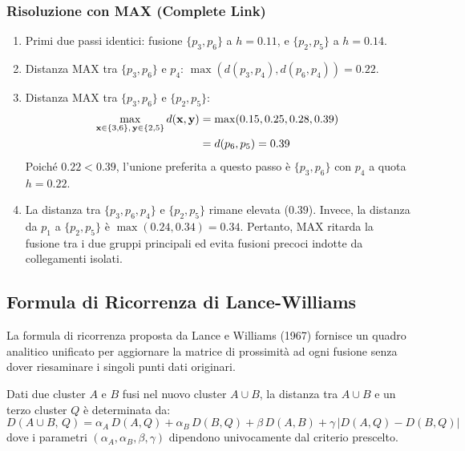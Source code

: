 \subsubsection{Risoluzione con MAX (Complete Link)}
\begin{enumerate}
    \item Primi due passi identici: fusione $\{p_3, p_6\}$ a $h = 0.11$, e $\{p_2, p_5\}$ a $h = 0.14$.
    \item Distanza MAX tra $\{p_3, p_6\}$ e $p_4$: $\max(d(p_3, p_4), d(p_6, p_4)) = 0.22$.
    \item Distanza MAX tra $\{p_3, p_6\}$ e $\{p_2, p_5\}$:
    \begin{align}
        \max_{\mathbf{x} \in \{3,6\}, \, \mathbf{y} \in \{2,5\}} d(\mathbf{x}, \mathbf{y}) &= \max(0.15, 0.25, 0.28, 0.39) \notag \\
        &= d(p_6, p_5) = 0.39
    \end{align}
    Poiché $0.22 < 0.39$, l'unione preferita a questo passo è $\{p_3, p_6\}$ con $p_4$ a quota $h = 0.22$.
    \item La distanza tra $\{p_3, p_6, p_4\}$ e $\{p_2, p_5\}$ rimane elevata ($0.39$). Invece, la distanza da $p_1$ a $\{p_2, p_5\}$ è $\max(0.24, 0.34) = 0.34$. Pertanto, MAX ritarda la fusione tra i due gruppi principali ed evita fusioni precoci indotte da collegamenti isolati.
\end{enumerate}

\subsection{Formula di Ricorrenza di Lance-Williams}

La formula di ricorrenza proposta da Lance e Williams (1967) fornisce un quadro analitico unificato per aggiornare la matrice di prossimità ad ogni fusione senza dover riesaminare i singoli punti dati originari.

\begin{theorem}
Dati due cluster $A$ e $B$ fusi nel nuovo cluster $A \cup B$, la distanza tra $A \cup B$ e un terzo cluster $Q$ è determinata da:
\begin{equation}
    D(A \cup B, \, Q) = \alpha_A \, D(A, Q) + \alpha_B \, D(B, Q) + \beta \, D(A, B) + \gamma \, |D(A, Q) - D(B, Q)|
    \label{eq:dm-lance-williams-general}
\end{equation}
dove i parametri $(\alpha_A, \alpha_B, \beta, \gamma)$ dipendono univocamente dal criterio prescelto.
\end{theorem}

